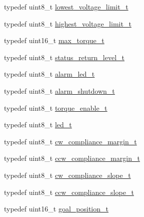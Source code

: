 \begin{DoxyCompactItemize}
\item 
typedef uint8\+\_\+t \hyperlink{structdynamixel_1_1servos_1_1_model_traits_3_01_ax12_01_4_1_1_c_t_a72cfdfd8425b57d9b2cad7ecf5cea18a}{lowest\+\_\+voltage\+\_\+limit\+\_\+t}
\item 
typedef uint8\+\_\+t \hyperlink{structdynamixel_1_1servos_1_1_model_traits_3_01_ax12_01_4_1_1_c_t_a0ec896de7f99023cdf96e38d9a214005}{highest\+\_\+voltage\+\_\+limit\+\_\+t}
\item 
typedef uint16\+\_\+t \hyperlink{structdynamixel_1_1servos_1_1_model_traits_3_01_ax12_01_4_1_1_c_t_a426746f28397608a2e790ef6316dc34e}{max\+\_\+torque\+\_\+t}
\item 
typedef uint8\+\_\+t \hyperlink{structdynamixel_1_1servos_1_1_model_traits_3_01_ax12_01_4_1_1_c_t_aa88aa0e9989bb854cc46babc1af6cb6b}{status\+\_\+return\+\_\+level\+\_\+t}
\item 
typedef uint8\+\_\+t \hyperlink{structdynamixel_1_1servos_1_1_model_traits_3_01_ax12_01_4_1_1_c_t_ac93eef0c9868d500579432907cd20d1e}{alarm\+\_\+led\+\_\+t}
\item 
typedef uint8\+\_\+t \hyperlink{structdynamixel_1_1servos_1_1_model_traits_3_01_ax12_01_4_1_1_c_t_a6b24e11ff21c93d9a7bc349e673e8855}{alarm\+\_\+shutdown\+\_\+t}
\item 
typedef uint8\+\_\+t \hyperlink{structdynamixel_1_1servos_1_1_model_traits_3_01_ax12_01_4_1_1_c_t_a3d99ff8f3e572df17184f79e37ffa714}{torque\+\_\+enable\+\_\+t}
\item 
typedef uint8\+\_\+t \hyperlink{structdynamixel_1_1servos_1_1_model_traits_3_01_ax12_01_4_1_1_c_t_a553021c58ce77060381d3d757709c76a}{led\+\_\+t}
\item 
typedef uint8\+\_\+t \hyperlink{structdynamixel_1_1servos_1_1_model_traits_3_01_ax12_01_4_1_1_c_t_a9e4073f1e3379524ebe340d053820f84}{cw\+\_\+compliance\+\_\+margin\+\_\+t}
\item 
typedef uint8\+\_\+t \hyperlink{structdynamixel_1_1servos_1_1_model_traits_3_01_ax12_01_4_1_1_c_t_a92b5c43ed5faad4b4e1cc9363e5ecfed}{ccw\+\_\+compliance\+\_\+margin\+\_\+t}
\item 
typedef uint8\+\_\+t \hyperlink{structdynamixel_1_1servos_1_1_model_traits_3_01_ax12_01_4_1_1_c_t_ab97da97e81716924c61b11ae85954399}{cw\+\_\+compliance\+\_\+slope\+\_\+t}
\item 
typedef uint8\+\_\+t \hyperlink{structdynamixel_1_1servos_1_1_model_traits_3_01_ax12_01_4_1_1_c_t_af8ec3714d72e7ea828c570a217c9f23e}{ccw\+\_\+compliance\+\_\+slope\+\_\+t}
\item 
typedef uint16\+\_\+t \hyperlink{structdynamixel_1_1servos_1_1_model_traits_3_01_ax12_01_4_1_1_c_t_a7309531129a6cd06f1ce590efeb2b8e0}{goal\+\_\+position\+\_\+t}

\end{DoxyCompactItemize}
